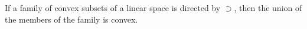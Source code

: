 If a family of convex subsets of a linear space is directed by $\supset$, then the union of the members of the family is convex.
